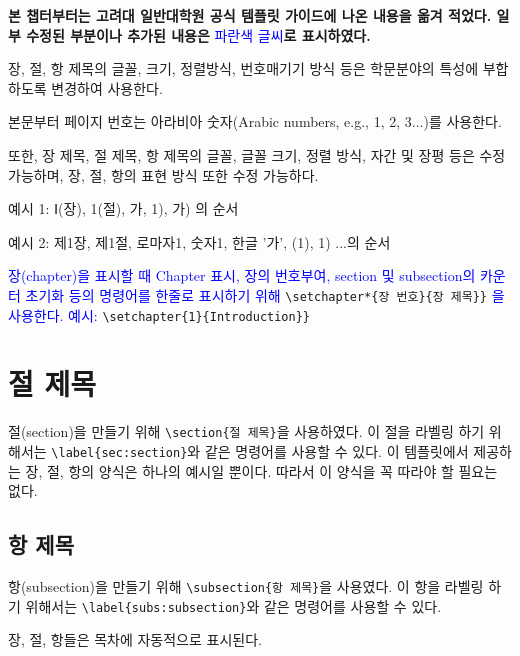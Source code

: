 
\textbf{본 챕터부터는 고려대 일반대학원 공식 템플릿 가이드에 나온 내용을 옮겨 적었다. 일부 수정된 부분이나 추가된 내용은} \textcolor{blue}{파란색 글씨}\textbf{로 표시하였다.} \bigskip

장, 절, 항 제목의 글꼴, 크기, 정렬방식, 번호매기기 방식 등은 학문분야의 특성에 부합하도록 변경하여 사용한다. \par
본문부터 페이지 번호는 아라비아 숫자(Arabic numbers, e.g., 1, 2, 3...)를 사용한다.\par
또한, 장 제목, 절 제목, 항 제목의 글꼴, 글꼴 크기, 정렬 방식, 자간 및 장평 등은 수정 가능하며, 장, 절, 항의 표현 방식 또한 수정 가능하다. \par
\bigskip
예시 1: Ⅰ(장), 1(절), 가, 1), 가) 의 순서 \par
예시 2: 제1장, 제1절, 로마자1, 숫자1, 한글 '가', (1), 1) ...의 순서 \par
\bigskip

\textcolor{blue}{ 장(chapter)을 표시할 때 Chapter 표시, 장의 번호부여, section 및 subsection의 카운터 초기화 등의 명령어를 한줄로 표시하기 위해 } \verb|\setchapter*{장 번호}{장 제목}}| \textcolor{blue}{ 을 사용한다. 예시: } \verb|\setchapter{1}{Introduction}}| \par


\section{절 제목}\label{sec:section}
절(section)을 만들기 위해 \verb|\section{절 제목}|을 사용하였다.
이 절을 라벨링 하기 위해서는 \verb|\label{sec:section}|와 같은 명령어를 사용할 수 있다.
이 템플릿에서 제공하는 장, 절, 항의 양식은 하나의 예시일 뿐이다.
따라서 이 양식을 꼭 따라야 할 필요는 없다.

%
\subsection{항 제목}\label{subs:subsection}
항(subsection)을 만들기 위해 \verb|\subsection{항 제목}|을 사용였다.
이 항을 라벨링 하기 위해서는 \verb|\label{subs:subsection}|와 같은 명령어를 사용할 수 있다.

장, 절, 항들은 목차에 자동적으로 표시된다.

